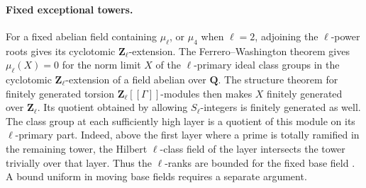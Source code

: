 \paragraph{Fixed exceptional towers.}
%
For a fixed abelian field containing \(\mu_\ell\), or \(\mu_4\) when
\(\ell=2\), adjoining the \(\ell\)-power roots gives its cyclotomic
\(\mathbf Z_\ell\)-extension. The Ferrero--Washington theorem
gives \(\mu_\ell(X)=0\) for the norm limit \(X\) of the
\(\ell\)-primary ideal class groups in the cyclotomic
\(\mathbf Z_\ell\)-extension of a field abelian over \(\mathbf Q\).
The structure theorem for finitely generated torsion
\(\mathbf Z_\ell[[\Gamma]]\)-modules then makes \(X\) finitely
generated over \(\mathbf Z_\ell\). Its quotient obtained by
allowing \(S_\ell\)-integers is finitely generated as well.
\cite[main theorem, p.~377]{f2-ferrero-washington}
The class group at each sufficiently high layer
is a quotient of this module on its \(\ell\)-primary part. Indeed,
above the first layer where a prime is totally ramified in the
remaining tower, the Hilbert \(\ell\)-class field of the layer
intersects the tower trivially over that layer. Thus the
\(\ell\)-ranks are bounded for the fixed base field
\cite{f2-ferrero-washington}. A bound uniform in moving base fields
requires a separate argument.

